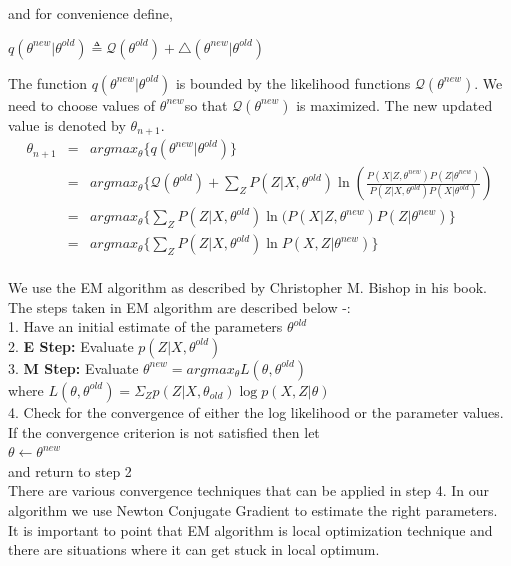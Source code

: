 \documentclass[12pt]{dalcsthesis}
\begin{document}
and for convenience define,

$q(\theta^{new}|\theta^{old})\triangleq\mathcal{Q}(\theta^{old})+\triangle(\theta^{new}|\theta^{old})$

The function $q(\theta^{new}|\theta^{old})$ is bounded by the likelihood
functions $\mathcal{Q}(\theta^{new})$. We need to choose values of
$\theta^{new}$so that $\mathcal{Q}(\theta^{new})$ is maximized.
The new updated value is denoted by $\theta_{n+1}.$
\begin{eqnarray}
\theta_{n+1} & = & argmax_{\theta}\{q(\theta^{new}|\theta^{old})\}\\
 & = & argmax_{\theta}\{\mathcal{Q}(\theta^{old})+\sum_{Z}P(Z|X,\theta^{old})\ln(\frac{P(X|Z,\theta^{new})P(Z|\theta^{new})}{P(Z|X,\theta^{old})P(X|\theta^{old})})\\
 & = & argmax_{\theta}\{\sum_{Z}P(Z|X,\theta^{old})\ln(P(X|Z,\theta^{new})P(Z|\theta^{new})\}\\
 & = & argmax_{\theta}\{\sum_{Z}P(Z|X,\theta^{old})\ln P(X,Z|\theta^{new})\}\\
\end{eqnarray}

We use the EM algorithm as described by Christopher M. Bishop\cite{bishop2006pattern} in his book. The steps taken in EM algorithm are described below -:
\\
1. Have an initial estimate of the parameters $\theta ^{old}$
\\
2. \textbf{E Step:} Evaluate $p(Z|X,\theta^{old})$
\\
3. \textbf{M Step:} Evaluate $\theta ^{new} = arg max _{\theta} L(\theta,\theta^{old})$
\\
\hspace*{20 mm} where 
$L(\theta,\theta^{old})=\Sigma _{Z} p(Z|X,\theta_{old}) \log p(X,Z|\theta)$
\\
4. Check for the convergence of either the log likelihood or the parameter values. If the convergence criterion is not satisfied then let
\\
\hspace*{20 mm} $\theta \leftarrow \theta^{new} $
\\
and return to step 2
\\
There are various convergence techniques that can be applied in step 4. In our algorithm we use Newton Conjugate Gradient to estimate the right parameters. It is important to point that EM algorithm is local optimization technique and there are situations where it can get stuck in local optimum. 		
\end{document}
